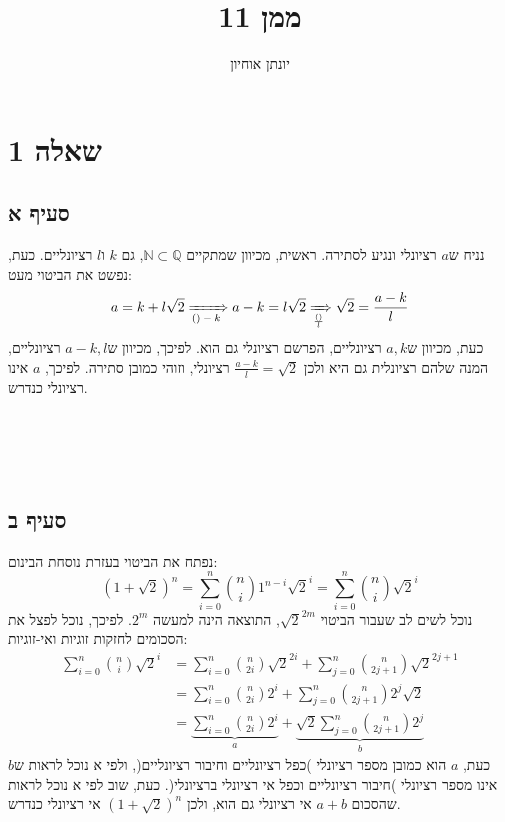 \documentclass[11pt, oneside]{article}
\title{ממן 11}
\author{יונתן אוחיון}
\newcommand{\qed}{\R{$\blacksquare$}}
\newcommand{\br}{\\\\\\\\\\}
\newcommand{\logr}[1]{\xRightarrow[\text{#1}]{}}
\newcommand{\mN}{\mathbb{N}}
\newcommand{\mQ}{\mathbb{Q}}
\newcommand{\q}[3]{\R{שאלה #3#2.#1}}
\begin{document}
\maketitle

\section{שאלה 1}
\subsection{סעיף א}
נניח ש$a$ רציונלי ונגיע לסתירה. ראשית, מכיוון שמתקיים $\mN \subset \mQ$, גם $k$ ו$l$ רציונליים. כעת, נפשט את הביטוי מעט:
\[
a = k + l\sqrt{2} \logr{$() - k$} a - k = l\sqrt{2} \logr{$\frac{()}{l}$} \sqrt{2} = \frac{a - k}{l}
\]
כעת, מכיוון ש$a, k$ רציונליים, הפרשם רציונלי גם הוא. לפיכך, מכיוון ש$a - k, l$ רציונליים, המנה שלהם רציונלית גם היא ולכן $\frac{a - k}{l} = \sqrt{2}$ רציונלי, וזוהי כמובן סתירה. לפיכך, $a$ אינו רציונלי כנדרש.
\br\qed

\subsection{סעיף ב}
נפתח את הביטוי בעזרת נוסחת הבינום:
\[
(1 + \sqrt{2})^n
= \sum^{n}_{i = 0} {n \choose i} 1^{n - i} \sqrt{2}^i
= \sum^{n}_{i = 0} {n \choose i} \sqrt{2}^i
\]
נוכל לשים לב שעבור הביטוי $\sqrt{2}^{2m}$, התוצאה הינה למעשה $2^m$. לפיכך, נוכל לפצל את הסכומים לחזקות זוגיות ואי-זוגיות:
\begin{align*}
\sum^{n}_{i = 0} {n \choose i} \sqrt{2}^i
&= \sum^{n}_{i = 0} {n \choose 2i} \sqrt{2}^{2i} + \sum^{n}_{j = 0} {n \choose 2j + 1} \sqrt{2}^{2j + 1}\\
&= \sum^{n}_{i = 0} {n \choose 2i} 2^i + \sum^{n}_{j = 0} {n \choose 2j + 1} 2^j\sqrt{2}\\
&= \underbrace{\sum^{n}_{i = 0} {n \choose 2i} 2^i}_{a} + \underbrace{\sqrt{2}\sum^{n}_{j = 0} {n \choose 2j + 1} 2^j}_{b}
\end{align*}
כעת, $a$ הוא כמובן מספר רציונלי )כפל רציונליים וחיבור רציונליים(, ולפי \q{1}{16}{}א נוכל לראות ש$b$ אינו מספר רציונלי )חיבור רציונליים וכפל אי רציונלי ברציונלי(. כעת, שוב לפי \q{1}{16}{}א נוכל לראות שהסכום $a + b$ אי רציונלי גם הוא, ולכן $(1 + \sqrt{2})^n$ אי רציונלי כנדרש.
\br\qed

\clearpage

\end{document}
